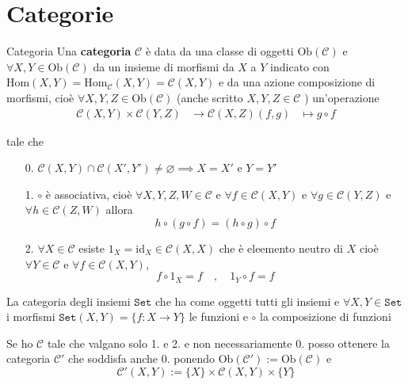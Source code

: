 \chapter{Categorie}

\begin{definition}{Categoria}
    Una \textbf{categoria} \(\mathcal{C}\) è data da una classe di oggetti \(\mathrm{Ob}{(\mathcal{C})}\) e \(\forall X, Y \in \mathrm{Ob}{(\mathcal{C})}\) da un insieme di morfismi da \(X \) a \(Y\) indicato con
    \(\mathrm{Hom}{(X,Y)} = \mathrm{Hom}_\mathcal{C} {(X, Y)} = \mathcal{C}{(X, Y)}\)  e da una
   azione  composizione di morfismi, cioè \(\forall X, Y, Z \in \mathrm{Ob}{(\mathcal{C})}\)
    (anche scritto \(X, Y, Z \in \mathcal{C}\) ) un'operazione 
    \begin{align*}
        \mathcal{C}{(X, Y)} \times  \mathcal{C}{(Y, Z)} &\to  \mathcal{C}{(X, Z)}
        {(f, g)} &\mapsto g \circ f
    \end{align*}

    tale che 
\begin{enumerate}[label = \arabic*.]
    \item[0.] \(\mathcal{C}{(X,Y)} \cap  \mathcal{C}{(X', Y')} \neq \varnothing \implies X = X' \text{ e } Y = Y'\) 
    \item[1.] \(\circ\) è associativa, cioè \(\forall X, Y, Z, W \in \mathcal{C}\) e \(\forall f \in \mathcal{C}{(X,Y)}\) e \(\forall g \in \mathcal{C}{(Y, Z)}\) e \(\forall h \in \mathcal{C}{(Z, W)}\)  allora 
        \[
          h \circ {(g \circ f)} = {(h \circ g)} \circ f
        \]
    \item[2.] \(\forall  X \in  \mathcal{C} \) esiste \(1_X = \mathrm{id}_X \in \mathcal{C}{(X, X)}\)
        che è eleemento neutro di \(X\) cioè \(\forall Y \in \mathcal{C}\) e \(\forall f
        \in \mathcal{C}{(X, Y)}\), 
        \[
          f \circ 1_X = f \quad, \quad 1_Y \circ f = f
        \]
\end{enumerate}
\end{definition}
\begin{example}{}
    La categoria degli insiemi \(\mathtt{Set} \) che ha come oggetti tutti gli
    insiemi e \(\forall X, Y \in \mathtt{Set} \) i morfismi \(\mathtt{Set}{(X, Y)} = \{f : X \to Y\}  \) le funzioni e \(\circ\) la composizione di funzioni
\end{example}
\begin{remark}{}
    Se ho \(\mathcal{C}\) tale che valgano solo 1. e 2. e non necessariamente 0. posso
    ottenere la categoria \(\mathcal{C}'\) che soddisfa anche 0. ponendo \(\mathrm{Ob}{(\mathcal{C}')} := \mathrm{Ob}{(\mathcal{C})}\) e 
    \[
      \mathcal{C}'{(X, Y)} := \{X\} \times \mathcal{C}{(X,Y)} \times \{Y\} 
    \]
\end{remark}
